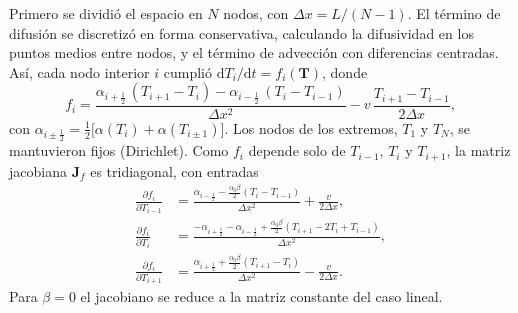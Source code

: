 \documentclass[final,5p,times,twocolumn,authoryear,11pt]{elsarticle}
\begin{document}
Primero se dividió el espacio en $N$ nodos, con $\Delta x = L/(N-1)$. El término de difusión se discretizó en forma conservativa, calculando la difusividad en los puntos medios entre nodos, y el término de advección con diferencias centradas. Así, cada nodo interior $i$ cumplió $\mathrm{d}T_i/\mathrm{d}t = f_i(\mathbf{T})$, donde
\begin{equation}
f_i = \frac{\alpha_{i+\frac12}\,(T_{i+1}-T_i) - \alpha_{i-\frac12}\,(T_i-T_{i-1})}{\Delta x^2}
- v\,\frac{T_{i+1}-T_{i-1}}{2\Delta x},
\label{eq:f_semidiscreta}
\end{equation}
\noindent con $\alpha_{i\pm\frac12}=\tfrac12\bigl[\alpha(T_i)+\alpha(T_{i\pm1})\bigr]$. Los nodos de los extremos, $T_1$ y $T_N$, se mantuvieron fijos (Dirichlet). Como $f_i$ depende solo de $T_{i-1}$, $T_i$ y $T_{i+1}$, la matriz jacobiana $\mathbf{J}_f$ es tridiagonal, con entradas
\begin{align}
\frac{\partial f_i}{\partial T_{i-1}} &= \frac{\alpha_{i-\frac12} - \tfrac{\alpha_0\beta}{2}(T_i-T_{i-1})}{\Delta x^2} + \frac{v}{2\Delta x},\nonumber\\
\frac{\partial f_i}{\partial T_{i}} &= \frac{-\alpha_{i+\frac12}-\alpha_{i-\frac12} + \tfrac{\alpha_0\beta}{2}(T_{i+1}-2T_i+T_{i-1})}{\Delta x^2},\nonumber\\
\frac{\partial f_i}{\partial T_{i+1}} &= \frac{\alpha_{i+\frac12} + \tfrac{\alpha_0\beta}{2}(T_{i+1}-T_i)}{\Delta x^2} - \frac{v}{2\Delta x}.
\label{eq:jacobiano}
\end{align}
\noindent Para $\beta=0$ el jacobiano se reduce a la matriz constante del caso lineal.
\end{document}
